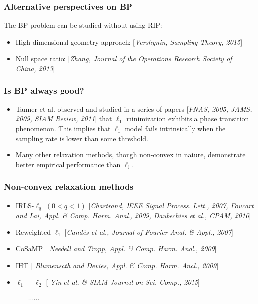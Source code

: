 \documentclass[11pt]{beamer}
\begin{document}
\begin{frame}
\frametitle{Alternative perspectives on BP}

The BP problem can be studied without using RIP:

\begin{itemize}
\item High-dimensional geometry approach: [{\color{blue}\it Vershynin, Sampling Theory, 2015}]

\medskip

\item Null space ratio: [{\color{blue}\it Zhang, Journal of the Operations Research Society of China, 2013}] 
\end{itemize}


\end{frame} 

\begin{frame}
\frametitle{Is BP always good?}

\begin{itemize}
\item Tanner et al. observed and studied in a series of papers [{\color{blue}\it PNAS, 2005, JAMS, 2009, SIAM Review, 2011}] that $\ell_1$ minimization exhibits a phase transition phenomenon. This implies that $\ell_1$ model fails intrinsically when the sampling rate is lower than some threshold. 

\bigskip

\item Many other relaxation methods, though non-convex in nature, demonstrate better empirical performance than $\ell_1$.  

\end{itemize}

\end{frame}


\begin{frame}
\frametitle{Non-convex relaxation methods}
\begin{itemize}
\item IRLS-$\ell_q$ $(0<q<1)$ [{\color{blue}\it Chartrand, IEEE Signal Process. Lett., 2007, Foucart and Lai, Appl. \& Comp. Harm. Anal., 2009, Daubechies et al., CPAM, 2010}]
\medskip
\item Reweighted $\ell_1$ [{\color{blue}\it Cand\`es et al., Journal of Fourier Anal. \& Appl., 2007}] 
\medskip
\item {\color{orange}CoSaMP} [{\color{blue} \it Needell and Tropp, Appl. \& Comp. Harm. Anal., 2009}]
\medskip
\item {\color{orange}IHT} [{\color{blue} \it Blumensath and Devies, Appl. \& Comp. Harm. Anal., 2009}]
\medskip
\item $\ell_1-\ell_2$ [{\color{blue} \it Yin et al, \& SIAM Journal on Sci. Comp., 2015}]
\end{itemize}
\medskip
\ \ \ \ \ \ \ $\cdots \cdots$
\end{frame}
\end{document}
